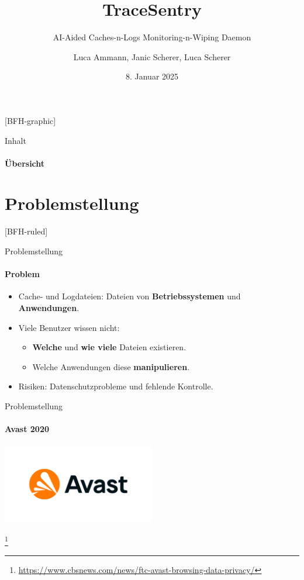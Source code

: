 \documentclass[
    ngerman,%
    authorontitle=true,
]{bfhbeamer}
\title{TraceSentry}
\subtitle{AI-Aided Caches-n-Logs Monitoring-n-Wiping Daemon}
\author[L. Ammann, J. Scherer, L. Scherer]{Luca Ammann, Janic Scherer, Luca Scherer}
\date{8. Januar 2025}
\institute{BFH-TI}
\begin{document}
    [BFH-graphic]
    \maketitle

    \begin{frame}{Inhalt}
        \framesubtitle{Übersicht}
        \tableofcontents
    \end{frame}


    \section{Problemstellung}\label{sec:problemstellung}
    [BFH-ruled]
    \frame{\sectionpage}

    \begin{frame}{Problemstellung}
        \framesubtitle{Problem}
        \begin{itemize}
            \item Cache- und Logdateien: Dateien von \textbf{Betriebssystemen} und \textbf{Anwendungen}.
            \item Viele Benutzer wissen nicht:
            \begin{itemize}
                \item \textbf{Welche} und \textbf{wie viele} Dateien existieren.
                \item Welche Anwendungen diese \textbf{manipulieren}.
            \end{itemize}
            \item Risiken: Datenschutzprobleme und fehlende Kontrolle.
        \end{itemize}
    \end{frame}

    \begin{frame}{Problemstellung}
        \framesubtitle{Avast 2020}
        \begin{center}
            \includegraphics[width=0.5\textwidth]{assets/presentation/avast-logo}
        \end{center}
        \footnote{\url{https://www.cbsnews.com/news/ftc-avast-browsing-data-privacy/}}
    \end{frame}
\end{document}
